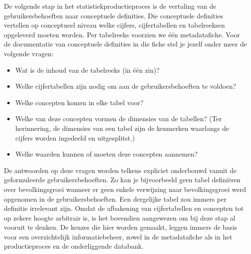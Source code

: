 \documentclass[\mainfiledir/00_handleiding_statistiekproductie.tex]{subfiles}
\begin{document}
De volgende stap in het statistiekproductieproces is de vertaling van de gebruikersbehoeften naar conceptuele definities. Die conceptuele definities vertellen op conceptueel niveau welke cijfers, cijfertabellen en tabelreeksen opgeleverd moeten worden. Per tabelreeks voorzien we één metadatafiche. Voor de documentatie van conceptuele definities in die fiche stel je jezelf onder meer de volgende vragen:
\begin{itemize}[nosep]
\item Wat is de inhoud van de tabelreeks (in één zin)?
\item Welke cijfertabellen zijn nodig om aan de gebruikersbehoeften te voldoen?
\item Welke concepten komen in elke tabel voor?
\item Welke van deze concepten vormen de dimensies van de tabellen? (Ter herinnering, de dimensies van een tabel zijn de kenmerken waarlangs de cijfers worden ingedeeld en uitgesplitst.)
\item Welke waarden kunnen of moeten deze concepten aannemen?
\end{itemize}
De antwoorden op deze vragen worden telkens expliciet onderbouwd vanuit de geformuleerde gebruikersbehoeften. Zo kan je bijvoorbeeld geen tabel definiëren over bevolkingsgroei wanneer er geen enkele verwijzing naar bevolkingsgroei werd opgenomen in de gebruikersbehoeften. Een dergelijke tabel zou immers per definitie irrelevant zijn. Omdat de afbakening van cijfertabellen en concepten tot op zekere hoogte arbitrair is, is het bovendien aangewezen om bij deze stap al vooruit te denken. De keuzes die hier worden gemaakt, leggen immers de basis voor een overzichtelijk informatiebeheer, zowel in de metadatafiche als in het productieproces en de onderliggende databank.
\end{document}
